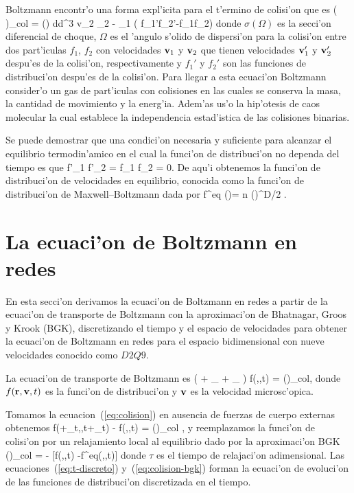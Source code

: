 Boltzmann encontr'o una forma expl'icita para el t'ermino de colisi'on que es
\BE
\left(  \right)_{col} = 
\int \sigma(\Omega) d\Omega \int d^3 v_2 \vert \vv_2 - \vv_1 \vert \left( f_1'f_2'-f_1f_2\right)
\EE
donde $\sigma(\Omega)$ es la secci'on diferencial de choque, 
$\Omega$ es el 'angulo s'olido de dispersi'on  para la colisi'on entre dos part'iculas $f_1$, $f_2$ 
con velocidades $\textbf v_1$ y $\textbf v_2$ que tienen  velocidades  $\textbf v_1'$ y $\textbf v_2'$ despu'es de 
la colisi'on, respectivamente y $f_1'$ y $f_2'$ son  las funciones de distribuci'on despu'es de la colisi'on. 
Para llegar a esta ecuaci'on Boltzmann consider'o un gas de part'iculas con colisiones  en las cuales
se conserva la masa, la cantidad de movimiento y la energ'ia. Adem'as us'o la hip'otesis
de caos molecular la cual establece la independencia estad'istica de las colisiones binarias.

Se  puede demostrar que una condici'on necesaria y suficiente para alcanzar el equilibrio termodin'amico
en el cual la funci'on de distribuci'on no dependa del tiempo es que
\BE
f'_1 f'_2  = f_1 f_2 = 0.
\EE
De aqu'i obtenemos la funci'on de distribuci'on de velocidades en equilibrio, conocida como la
funci'on de distribuci'on de Maxwell--Boltzmann dada por 
\BE\label{ec:maxwell-boltzmann}
f^{eq} (\vv)= n \left(\right)^{D/2} .
\EE


\section{La ecuaci'on de Boltzmann en redes}
\label{sec:ebr}


En esta secci'on derivamos la ecuaci'on de Boltzmann en redes a partir de la ecuaci'on
de transporte de Boltzmann con la aproximaci'on de  Bhatnagar, Groos y Krook (BGK), discretizando el tiempo y el espacio
de velocidades para obtener la ecuaci'on de Boltzmann en redes para el espacio bidimensional
con nueve velocidades conocido como $D2Q9$.

La ecuaci'on de transporte de Boltzmann es
\BE\label{ec:etb-bgk}
\left(
 + \vv \cdot \nabla_{\vr} + \cdot \nabla_{\vv}
\right) 
f(\vr,\vv,t) = \left(\right)_{col},
\EE
donde $f(\textbf r,\textbf v,t)$ es la funci'on de distribuci'on y
$\textbf v$ es la velocidad microsc'opica.

Tomamos la ecuacion~(\ref{eq:colision})  en ausencia de fuerzas de cuerpo
externas obtenemos
\BE\label{eq:t-discreto}
f(\vr+\vv \delta_t,\vv,t+\delta_t) - f(\vr,\vv,t) =
\left(\right)_{col} ,
\EE
y reemplazamos la funci'on de colisi'on por un relajamiento local al equilibrio dado por  
la aproximaci'on BGK~\cite{bgk54,higuera89}
\BE\label{eq:colision-bgk}
\left(\right)_{col} = - [f(\vr,\vv,t) -f^{eq}(\vr,\vv,t)]
\EE
donde $\tau$ es el tiempo de relajaci'on adimensional. Las ecuaciones~(\ref{eq:t-discreto})
y~(\ref{eq:colision-bgk}) forman la ecuaci'on de evoluci'on de las funciones de distribuci'on discretizada en el tiempo. 


